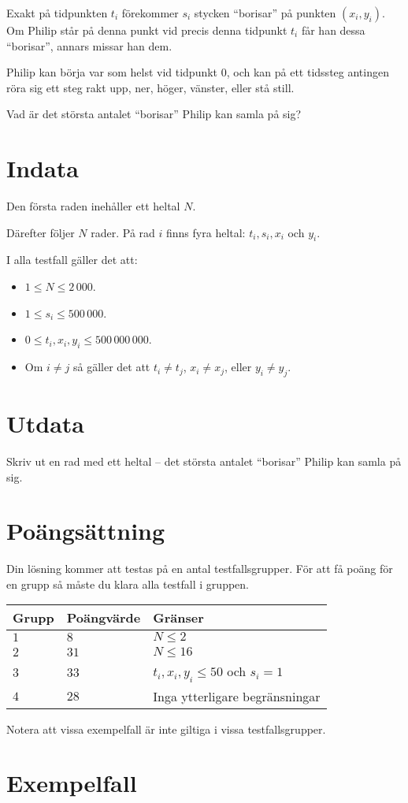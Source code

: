 

Exakt på tidpunkten $t_{i}$ förekommer $s_{i}$ stycken ``borisar'' på punkten $(x_{i}, y_{i})$. Om Philip står på denna punkt vid precis denna tidpunkt $t_{i}$ får han dessa ``borisar'', annars missar han dem.

Philip kan börja var som helst vid tidpunkt 0, och kan på ett tidssteg antingen röra sig ett steg rakt upp, ner, höger, vänster, eller stå still.

Vad är det största antalet ``borisar'' Philip kan samla på sig?

\section*{Indata}
Den första raden inehåller ett heltal $N$.

Därefter följer $N$ rader. På rad $i$ finns fyra heltal: $t_{i}, s_{i}, x_{i}$ och $y_{i}$.

I alla testfall gäller det att:
\begin{itemize}
  \item $1 \le N \le 2\,000$.
  \item $1 \le s_{i} \le 500\,000$.
  \item $0 \le t_{i}, x_{i}, y_{i} \le 500\,000\,000$.
  \item Om $i \neq j$ så gäller det att
    $t_{i} \neq t_{j}$,
    $x_{i} \neq x_{j}$, eller
    $y_{i} \neq y_{j}$.
\end{itemize}

\section*{Utdata}
Skriv ut en rad med ett heltal -- det största antalet ``borisar'' Philip kan samla på sig.

\section*{Poängsättning}
Din lösning kommer att testas på en antal testfallsgrupper.
För att få poäng för en grupp så måste du klara alla testfall i gruppen.

\noindent
\begin{tabular}{| l | l | l |}
  \hline
  Grupp & Poängvärde & Gränser \\ \hline
  $1$   & $8$        & $N \le 2$ \\ \hline
  $2$   & $31$       & $N \le 16$ \\ \hline
  $3$   & $33$       & $t_{i},x_{i},y_{i}\le 50$ och $s_{i} = 1$ \\ \hline
  $4$   & $28$       & Inga ytterligare begränsningar \\ \hline
\end{tabular}

Notera att vissa exempelfall är inte giltiga i vissa testfallsgrupper.

\section*{Exempelfall}

